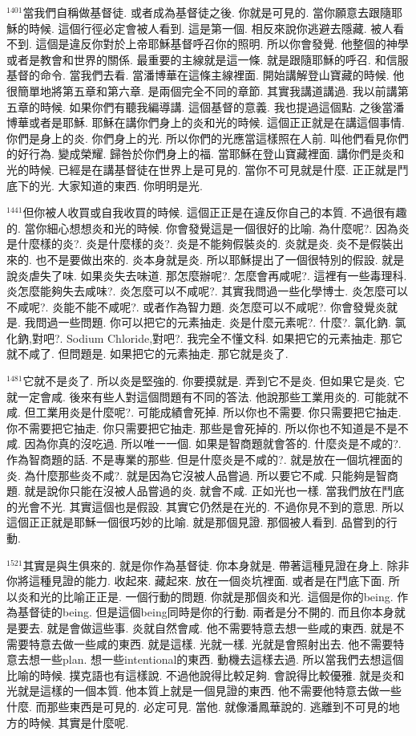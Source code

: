 \documentclass{book}
\begin{document}
$^{1401}$當我們自稱做基督徒.
或者成為基督徒之後.
你就是可見的.
當你願意去跟隨耶穌的時候.
這個行徑必定會被人看到.
這是第一個.
相反來說你逃避去隱藏.
被人看不到.
這個是違反你對於上帝耶穌基督呼召你的照明.
所以你會發覺.
他整個的神學或者是教會和世界的關係.
最重要的主線就是這一條.
就是跟隨耶穌的呼召.
和信服基督的命令.
當我們去看.
當潘博華在這條主線裡面.
開始講解登山寶藏的時候.
他很簡單地將第五章和第六章.
是兩個完全不同的章節.
其實我講道講過.
我以前講第五章的時候.
如果你們有聽我編導講.
這個基督的意義.
我也提過這個點.
之後當潘博華或者是耶穌.
耶穌在講你們身上的炎和光的時候.
這個正正就是在講這個事情.
你們是身上的炎.
你們身上的光.
所以你們的光應當這樣照在人前.
叫他們看見你們的好行為.
變成榮耀.
歸咎於你們身上的福.
當耶穌在登山寶藏裡面.
講你們是炎和光的時候.
已經是在講基督徒在世界上是可見的.
當你不可見就是什麼.
正正就是鬥底下的光.
大家知道的東西.
你明明是光.

$^{1441}$但你被人收買或自我收買的時候.
這個正正是在違反你自己的本質.
不過很有趣的.
當你細心想想炎和光的時候.
你會發覺這是一個很好的比喻.
為什麼呢?.
因為炎是什麼樣的炎?.
炎是什麼樣的炎?.
炎是不能夠假裝炎的.
炎就是炎.
炎不是假裝出來的.
也不是要做出來的.
炎本身就是炎.
所以耶穌提出了一個很特別的假設.
就是說炎虐失了味.
如果炎失去味道.
那怎麼辦呢?.
怎麼會再咸呢?.
這裡有一些毒理科.
炎怎麼能夠失去咸味?.
炎怎麼可以不咸呢?.
其實我問過一些化學博士.
炎怎麼可以不咸呢?.
炎能不能不咸呢?.
或者作為智力題.
炎怎麼可以不咸呢?.
你會發覺炎就是.
我問過一些問題.
你可以把它的元素抽走.
炎是什麼元素呢?.
什麼?.
氯化鈉.
氯化鈉,對吧?.
Sodium Chloride,對吧?.
我完全不懂文科.
如果把它的元素抽走.
那它就不咸了.
但問題是.
如果把它的元素抽走.
那它就是炎了.

$^{1481}$它就不是炎了.
所以炎是堅強的.
你要摸就是.
弄到它不是炎.
但如果它是炎.
它就一定會咸.
後來有些人對這個問題有不同的答法.
他說那些工業用炎的.
可能就不咸.
但工業用炎是什麼呢?.
可能成績會死掉.
所以你也不需要.
你只需要把它抽走.
你不需要把它抽走.
你只需要把它抽走.
那些是會死掉的.
所以你也不知道是不是不咸.
因為你真的沒吃過.
所以唯一一個.
如果是智商題就會答的.
什麼炎是不咸的?.
作為智商題的話.
不是專業的那些.
但是什麼炎是不咸的?.
就是放在一個坑裡面的炎.
為什麼那些炎不咸?.
就是因為它沒被人品嘗過.
所以要它不咸.
只能夠是智商題.
就是說你只能在沒被人品嘗過的炎.
就會不咸.
正如光也一樣.
當我們放在鬥底的光會不光.
其實這個也是假設.
其實它仍然是在光的.
不過你見不到的意思.
所以這個正正就是耶穌一個很巧妙的比喻.
就是那個見證.
那個被人看到.
品嘗到的行動.

$^{1521}$其實是與生俱來的.
就是你作為基督徒.
你本身就是.
帶著這種見證在身上.
除非你將這種見證的能力.
收起來.
藏起來.
放在一個炎坑裡面.
或者是在鬥底下面.
所以炎和光的比喻正正是.
一個行動的問題.
你就是那個炎和光.
這個是你的being.
作為基督徒的being.
但是這個being同時是你的行動.
兩者是分不開的.
而且你本身就是要去.
就是會做這些事.
炎就自然會咸.
他不需要特意去想一些咸的東西.
就是不需要特意去做一些咸的東西.
就是這樣.
光就一樣.
光就是會照射出去.
他不需要特意去想一些plan.
想一些intentional的東西.
動機去這樣去過.
所以當我們去想這個比喻的時候.
撲克語也有這樣說.
不過他說得比較足夠.
會說得比較優雅.
就是炎和光就是這樣的一個本質.
他本質上就是一個見證的東西.
他不需要他特意去做一些什麼.
而那些東西是可見的.
必定可見.
當他.
就像潘鳳華說的.
逃離到不可見的地方的時候.
其實是什麼呢.
\end{document}
